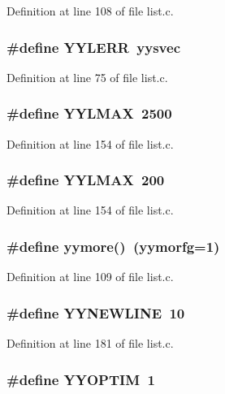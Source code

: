 Definition at line 108 of file list.c.
\subsubsection{\setlength{\rightskip}{0pt plus 5cm}\#define YYLERR~\bf{yysvec}}\label{list_8c_21cf66c12b75036afb2bb450961f3913}




Definition at line 75 of file list.c.
\subsubsection{\setlength{\rightskip}{0pt plus 5cm}\#define YYLMAX~2500}\label{list_8c_528b4a36c14b40b6b7a96b1df6362045}




Definition at line 154 of file list.c.
\subsubsection{\setlength{\rightskip}{0pt plus 5cm}\#define YYLMAX~200}\label{list_8c_528b4a36c14b40b6b7a96b1df6362045}




Definition at line 154 of file list.c.
\subsubsection{\setlength{\rightskip}{0pt plus 5cm}\#define yymore()~(\bf{yymorfg}=1)}\label{list_8c_745d37b5e002b2e5f93ad42ea7b554be}




Definition at line 109 of file list.c.
\subsubsection{\setlength{\rightskip}{0pt plus 5cm}\#define YYNEWLINE~10}\label{list_8c_dd266327fc2a9d001a866e62efae8a68}




Definition at line 181 of file list.c.
\subsubsection{\setlength{\rightskip}{0pt plus 5cm}\#define YYOPTIM~1}\label{list_8c_8e9c50a68401eb5c606c16ad45397fa2}




